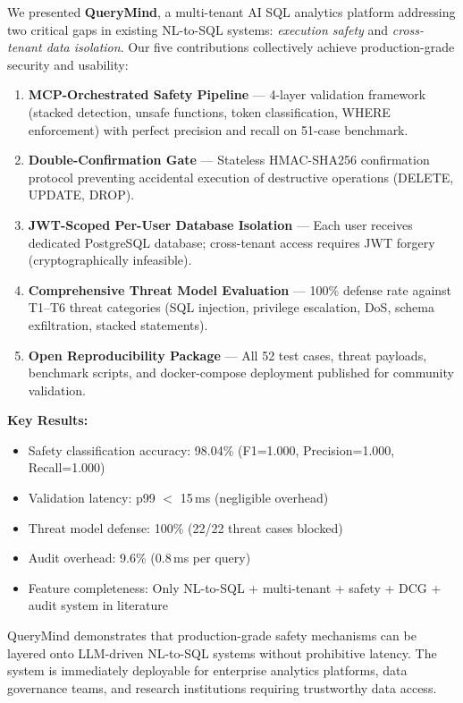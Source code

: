 \documentclass[conference]{IEEEtran}
\begin{document}
We presented \textbf{QueryMind}, a multi-tenant AI SQL analytics platform addressing two critical gaps in existing NL-to-SQL systems: \emph{execution safety} and \emph{cross-tenant data isolation}. Our five contributions collectively achieve production-grade security and usability:

\begin{enumerate}
  \item \textbf{MCP-Orchestrated Safety Pipeline} --- 4-layer validation framework (stacked detection, unsafe functions, token classification, WHERE enforcement) with perfect precision and recall on 51-case benchmark.
  
  \item \textbf{Double-Confirmation Gate} --- Stateless HMAC-SHA256 confirmation protocol preventing accidental execution of destructive operations (DELETE, UPDATE, DROP).
  
  \item \textbf{JWT-Scoped Per-User Database Isolation} --- Each user receives dedicated PostgreSQL database; cross-tenant access requires JWT forgery (cryptographically infeasible).
  
  \item \textbf{Comprehensive Threat Model Evaluation} --- 100\% defense rate against T1--T6 threat categories (SQL injection, privilege escalation, DoS, schema exfiltration, stacked statements).
  
  \item \textbf{Open Reproducibility Package} --- All 52 test cases, threat payloads, benchmark scripts, and docker-compose deployment published for community validation.
\end{enumerate}

\textbf{Key Results:}
\begin{itemize}
  \item Safety classification accuracy: 98.04\% (F1=1.000, Precision=1.000, Recall=1.000)
  \item Validation latency: p99 $<$ 15\,ms (negligible overhead)
  \item Threat model defense: 100\% (22/22 threat cases blocked)
  \item Audit overhead: 9.6\% (0.8\,ms per query)
  \item Feature completeness: Only NL-to-SQL + multi-tenant + safety + DCG + audit system in literature
\end{itemize}

QueryMind demonstrates that production-grade safety mechanisms can be layered onto LLM-driven NL-to-SQL systems without prohibitive latency. The system is immediately deployable for enterprise analytics platforms, data governance teams, and research institutions requiring trustworthy data access.
\end{document}
